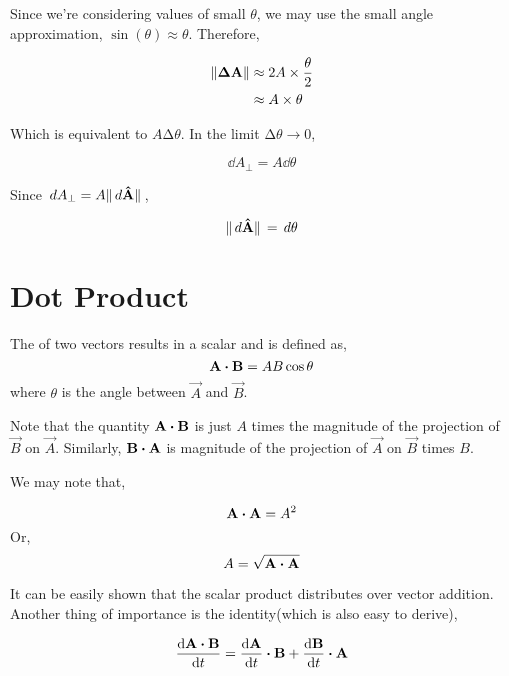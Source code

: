 Since we're considering values of small \(\theta\), we may use the small angle approximation,
\(\sin(\theta) \approx \theta\). Therefore,

\begin{marginfigure}
    \centering
    \caption{\(\increment\vec{A} \perp \vec{A}\)}
    \label{fig: timedev}
\end{marginfigure}

\begin{align}
    \norm{\boldsymbol{\mathbf{\Delta A}}} &\approx 2A \times \frac{\theta}{2}\\ 
    &\approx A \times \theta
\end{align}

Which is equivalent to \(A \increment \theta\). In the limit \(\increment \theta \to 0\),

\begin{equation}
    \dd{A_{\perp}} = A \dd{\theta}
\end{equation}

Since \(\mathop{}{d}{A}_{\perp} = A\norm*{\mathop{}{d}{\boldsymbol{\mathbf{\hat{A}}}}}\),

\begin{equation}
    \norm*{\mathop{}{d}{\boldsymbol{\mathbf{\hat{A}}}}} = \mathop{}{d}{\theta}
\end{equation}

\section{Dot Product}

The  of two vectors results in a scalar and is defined as,
\[\vec{A} \dotproduct \vec{B} = AB \cos\theta\]
where \(\theta\) is the angle between \(\vec{A}\) and \(\vec{B}\). 

Note that the quantity \(\vec{A} \dtp \vec{B}\) is just \(A\) times 
the magnitude of the projection of \(\vec{B}\) on \(\vec{A}\). Similarly, \(\vec{B} \dtp \vec{A}\) is
magnitude of the projection of \(\vec{A}\) on \(\vec{B}\) times \(B\).

We may note that,

\[\vec{A} \dtp \vec{A} = A^2\] Or,
\[A = \sqrt{\vec{A} \dtp \vec{A}}\]

It can be easily shown that the scalar product distributes over vector addition. 
Another thing of importance is the identity(which is also easy to derive),

\[\dv{\vec{A} \dtp \vec{B}}{t} = \dv{\vec{A}}{t} \dtp \vec{B} + \dv{\vec{B}}{t} \dtp \vec{A}\]

